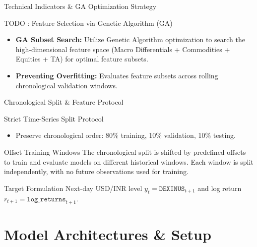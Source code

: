 \documentclass[aspectratio=169]{beamer}
\begin{document}
\begin{frame}{Technical Indicators \& GA Optimization Strategy}

	\begin{block}{TODO : Feature Selection via Genetic Algorithm (GA)}
		\begin{itemize}
			\item \textbf{GA Subset Search:} Utilize Genetic Algorithm optimization to search the high-dimensional feature space (Macro Differentials + Commodities + Equities + TA) for optimal feature subsets.
			\item \textbf{Preventing Overfitting:} Evaluates feature subsets across rolling chronological validation windows.
		\end{itemize}
	\end{block}
\end{frame}

\begin{frame}{Chronological Split \& Feature Protocol}
	\begin{block}{Strict Time-Series Split Protocol}
		\begin{itemize}
			\item Preserve chronological order: 80\% training, 10\% validation,
			10\% testing.
		\end{itemize}
	\end{block}

	\begin{block}{Offset Training Windows}
		The chronological split is shifted by predefined offsets to train and
		evaluate models on different historical windows. Each window is split
		independently, with no future observations used for training.
	\end{block}

	\begin{block}{Target Formulation}
		Next-day USD/INR level $y_t = \mathtt{DEXINUS}_{t+1}$ and
		log return $r_{t+1} = \mathtt{log\_returns}_{t+1}$.
	\end{block}
\end{frame}

\section{Model Architectures \& Setup}
\subsection*{}
\end{document}
